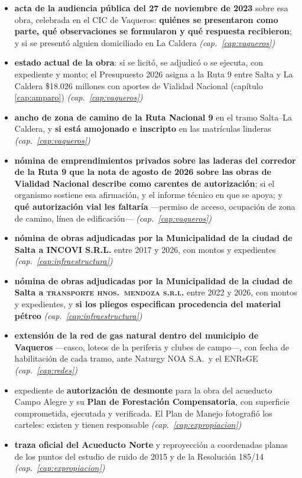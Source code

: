 \begin{itemize}[leftmargin=*]
\item \textbf{acta de la audiencia pública del 27 de noviembre de 2023} sobre esa obra, celebrada en el CIC de Vaqueros: \textbf{quiénes se presentaron como parte, qué observaciones se formularon y qué respuesta recibieron}; y si se presentó alguien domiciliado en La Caldera \textit{(cap.\ \ref{cap:vaqueros})}
\item \textbf{estado actual de la obra}: si se licitó, se adjudicó o se ejecuta, con expediente y monto; el Presupuesto 2026 asigna a la Ruta 9 entre Salta y La Caldera \$18.026 millones con aportes de Vialidad Nacional (capítulo \ref{cap:amparo}) \textit{(cap.\ \ref{cap:vaqueros})}
\item \textbf{ancho de zona de camino de la Ruta Nacional 9} en el tramo Salta--La Caldera, y \textbf{si está amojonado e inscripto} en las matrículas linderas \textit{(cap.\ \ref{cap:vaqueros})}
\item \textbf{nómina de emprendimientos privados sobre las laderas del corredor de la Ruta 9 que la nota de agosto de 2026 sobre las obras de Vialidad Nacional describe como carentes de autorización}; si el organismo sostiene esa afirmación, y el informe técnico en que se apoya; y \textbf{qué autorización vial les faltaría} ---permiso de acceso, ocupación de zona de camino, línea de edificación--- \textit{(cap.\ \ref{cap:vaqueros})}
\item \textbf{nómina de obras adjudicadas por la Municipalidad de la ciudad de Salta a INCOVI S.R.L.} entre 2017 y 2026, con montos y expedientes \textit{(cap.\ \ref{cap:infraestructura})}
\item \textbf{nómina de obras adjudicadas por la Municipalidad de la ciudad de Salta a \textsc{transporte hnos.\ mendoza s.r.l.}} entre 2022 y 2026, con montos y expedientes, y \textbf{si los pliegos especifican procedencia del material pétreo} \textit{(cap.\ \ref{cap:infraestructura})}
\item \textbf{extensión de la red de gas natural dentro del municipio de Vaqueros} ---casco, loteos de la periferia y clubes de campo---, con fecha de habilitación de cada tramo, ante Naturgy NOA S.A.\ y el ENReGE \textit{(cap.\ \ref{cap:redes})}
\item expediente de \textbf{autorización de desmonte} para la obra del acueducto Campo
Alegre y su \textbf{Plan de Forestación Compensatoria}, con superficie comprometida,
ejecutada y verificada. El Plan de Manejo fotografió los carteles: existen y tienen
responsable \textit{(cap.\ \ref{cap:expropiacion})}
\item \textbf{traza oficial del Acueducto Norte} y reproyección a coordenadas planas de los puntos del estudio de ruido de 2015 y de la Resolución 185/14 \textit{(cap.\ \ref{cap:expropiacion})}
\end{itemize}

